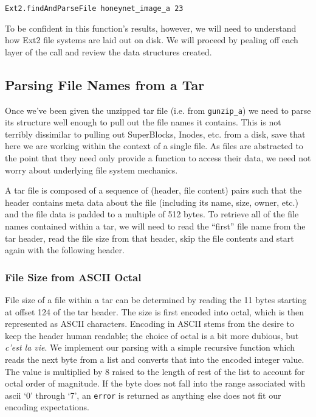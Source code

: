 \documentclass[nocopyrightspace]{sigplanconf}
\begin{document}
\begin{lstlisting}
Ext2.findAndParseFile honeynet_image_a 23
\end{lstlisting}

To be confident in this function's results, however, we will need to
understand how Ext2 file systems are laid out on disk. We will proceed by
pealing off each layer of the call and review the data structures created.

\subsection{Parsing File Names from a Tar}
Once we've been given the unzipped tar file (i.e. from {\tt gunzip\_a}) we
need to parse its structure well enough to pull out the file names it
contains. This is not terribly dissimilar to pulling out SuperBlocks, Inodes,
etc. from a disk, save that here we are working within the context of a single
file. As files are abstracted to the point that they need only provide a
function to access their data, we need not worry about underlying file system
mechanics.

A tar file is composed of a sequence of (header, file content) pairs such that
the header contains meta data about the file (including its name, size, owner,
etc.) and the file data is padded to a multiple of 512 bytes. To retrieve all
of the file names contained within a tar, we will need to read the ``first''
file name from the tar header, read the file size from that header, skip the
file contents and start again with the following header.

\subsubsection{File Size from ASCII Octal}
File size of a file within a tar can be determined by reading the 11 bytes
starting at offset 124 of the tar header. The size is first encoded into
octal, which is then represented as ASCII characters. Encoding in ASCII stems
from the desire to keep the header human readable; the choice of octal is a
bit more dubious, but {\it c'est la vie}. We implement our parsing with a
simple recursive function which reads the next byte from a list and converts
that into the encoded integer value. The value is multiplied by 8 raised to
the length of rest of the list to account for octal order of magnitude. If the
byte does not fall into the range associated with ascii `0' through `7', an
{\tt error} is returned as anything else does not fit our encoding
expectations.
\end{document}

